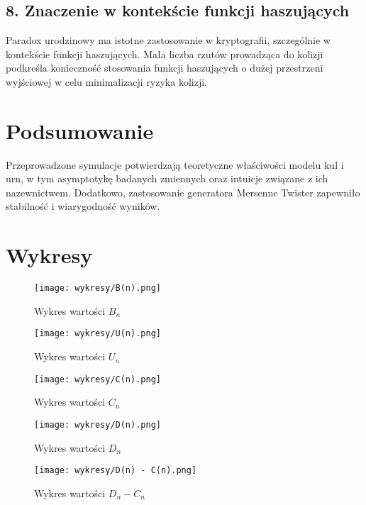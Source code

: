 \documentclass{article}
\begin{document}
\subsection*{8. Znaczenie w kontekście funkcji haszujących}
Paradox urodzinowy ma istotne zastosowanie w kryptografii, szczególnie w kontekście funkcji haszujących. Mała liczba rzutów prowadząca do kolizji podkreśla konieczność stosowania funkcji haszujących o dużej przestrzeni wyjściowej w celu minimalizacji ryzyka kolizji.

\section{Podsumowanie}
Przeprowadzone symulacje potwierdzają teoretyczne właściwości modelu kul i urn, w tym asymptotykę badanych zmiennych oraz intuicje związane z ich nazewnictwem. Dodatkowo, zastosowanie generatora Mersenne Twister zapewniło stabilność i wiarygodność wyników.

\section{Wykresy}
\begin{figure}[h]
    \centering
    \texttt{[image: wykresy/B(n).png]}
    \caption{Wykres wartości $B_n$}
\end{figure}
\begin{figure}[h]
    \centering
    \texttt{[image: wykresy/U(n).png]}
    \caption{Wykres wartości $U_n$}
\end{figure}
\begin{figure}[h]
    \centering
    \texttt{[image: wykresy/C(n).png]}
    \caption{Wykres wartości $C_n$}
\end{figure}
\begin{figure}[h]
    \centering
    \texttt{[image: wykresy/D(n).png]}
    \caption{Wykres wartości $D_n$}
\end{figure}
\begin{figure}[h]
    \centering
    \texttt{[image: wykresy/D(n) - C(n).png]}
    \caption{Wykres wartości $D_n - C_n$}
\end{figure}
\end{document}

